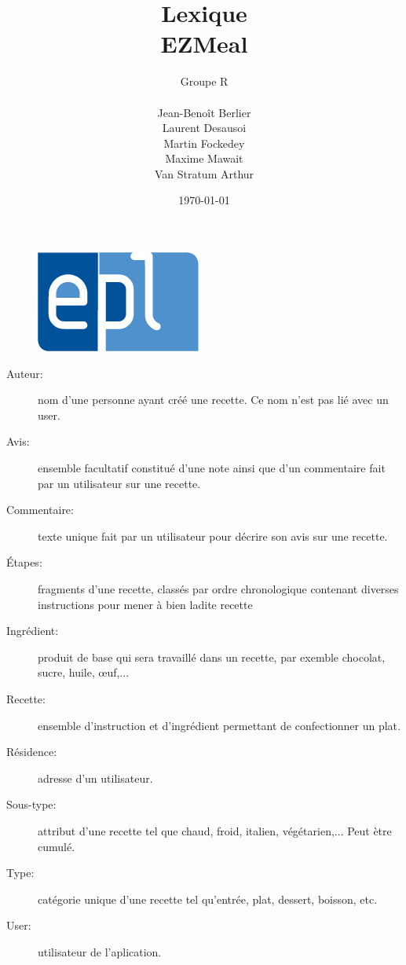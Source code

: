 \documentclass[a4paper,10pt]{article}
\title{Lexique \\	EZMeal}
\author{Groupe R\\ \\Jean-Benoît Berlier\\Laurent Desausoi \\ Martin Fockedey \\Maxime Mawait \\Van Stratum Arthur
}
\date{\today}
\begin{document}
\begin{titlepage}
\begin{figure}[t]
\includegraphics[scale=0.3]{epl-logo.jpg}
\end{figure}

\maketitle 
\end{titlepage}

\begin{description}
 \item [Auteur:] nom d'une personne ayant créé une recette. Ce nom n'est pas lié avec un user.
 \item [Avis:] ensemble facultatif constitué d'une note ainsi que d'un commentaire fait par un utilisateur sur une recette.
 \item [Commentaire:] texte unique fait par un utilisateur pour décrire son avis sur une recette.
 \item [Étapes:] fragments d'une recette, classés par ordre chronologique contenant diverses instructions pour mener à bien ladite recette
 \item [Ingrédient:] produit de base qui sera travaillé dans un recette, par exemble chocolat, sucre, huile, œuf,...
 \item [Recette:] ensemble d'instruction et d'ingrédient permettant de confectionner un plat.
 \item [Résidence:] adresse d'un utilisateur.
 \item [Sous-type:] attribut d'une recette tel que chaud, froid, italien, végétarien,... Peut ètre cumulé.
 \item [Type:] catégorie unique d'une recette tel qu'entrée, plat, dessert, boisson, etc.
 \item [User:] utilisateur de l'aplication.
 
\end{description}
\end{document}
